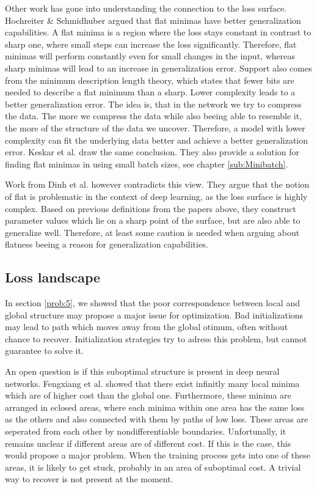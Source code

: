 Other work has gone into understanding the connection to the loss surface.
Hochreiter \& Schmidhuber \cite{hochreiter1997flat} argued that flat minimas
have better generalization capabilities. A flat minima is a region where the
loss stays constant in contrast to sharp one, where small steps can increase
the loss significantly. Therefore, flat minimas will perform constantly even for
small changes in the input, whereas sharp minimas will lead to an increase in
generalization error. Support also comes from the minimum description length
theory, which states that fewer bits are needed to describe a flat minimum than
a sharp. Lower complexity leads to a better generalization error. The idea is,
that in the network we try to compress the data. The more we compress the data
while also beeing able to resemble it, the more of the structure of the data we
uncover. Therefore, a model with lower complexity can fit the underlying data
better and achieve a better generalization error. Keskar et al.
\cite{keskar2016large} draw the same conclusion. They also provide a solution
for finding flat minimas in using small batch sizes, see chapter
\ref{sub:Minibatch}.

Work from Dinh et al. \cite{dinh2017sharp} however contradicts this view. They
argue that the notion of flat is problematic in the context of deep learning, as
the loss surface is highly complex. Based on previous definitions from the
papers above, they construct parameter values which lie on a sharp point of the
surface, but are also able to generalize well. Therefore, at least some caution
is needed when arguing about flatness beeing a reason for generalization
capabilities.

\subsection{Loss landscape}\label{loss_landscape}
In section \ref{prob:5}, we showed that the poor correspondence between local
and global structure may propose a major issue for optimization. Bad
initializations may lead to path which moves away from the global otimum, often
without chance to recover. Initialization strategies try to adress this problem,
but cannot guarantee to solve it.

An open question is if this suboptimal structure is present in deep neural
networks. Fengxiang et al. \cite{he2020piecewise} showed that there exist
infinitly many local minima which are of higher cost than the global one.
Furthermore, these minima are arranged in eclosed areas, where each minima
within one area has the same loss as the others and also connected with them by
paths of low loss. These areas are seperated from each other by
nondifferentiable boundaries. Unfortunally, it remains unclear if different areas 
are of different cost. If this is the case, this would propose a major problem.
When the training process gets into one of these areas, it is likely to get
stuck, probably in an area of suboptimal cost. A trivial way to recover is not
present at the moment.

